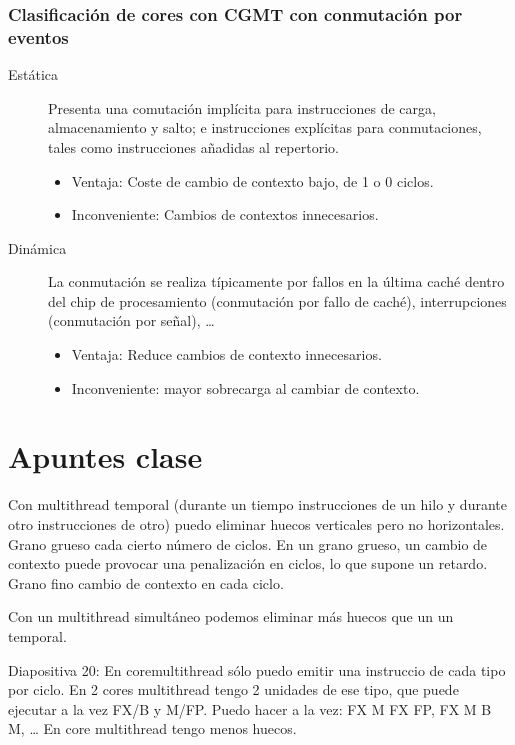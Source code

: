 \subsubsection{Clasificación de cores con CGMT con conmutación por eventos}
\begin{description}
    \item [Estática] Presenta una comutación implícita para instrucciones de carga, almacenamiento y salto; e instrucciones explícitas para conmutaciones, tales como instrucciones añadidas al repertorio.
        \begin{itemize}
            \item Ventaja: Coste de cambio de contexto bajo, de 1 o 0 ciclos.
            \item Inconveniente: Cambios de contextos innecesarios.
        \end{itemize}
    \item [Dinámica] La conmutación se realiza típicamente por fallos en la última caché dentro del chip de procesamiento (conmutación por fallo de caché), interrupciones (conmutación por señal), \ldots
        \begin{itemize}
            \item Ventaja: Reduce cambios de contexto innecesarios.
            \item Inconveniente: mayor sobrecarga al cambiar de contexto.
        \end{itemize}
\end{description}

\section{Apuntes clase}
Con multithread temporal (durante un tiempo instrucciones de un hilo y durante otro instrucciones de otro) puedo eliminar huecos verticales pero no horizontales. Grano grueso cada cierto número de ciclos. En un grano grueso, un cambio de contexto puede provocar una penalización en ciclos, lo que supone un retardo. Grano fino cambio de contexto en cada ciclo.

Con un multithread simultáneo podemos eliminar más huecos que un un temporal.

Diapositiva 20:
En coremultithread sólo puedo emitir una instruccio de cada tipo por ciclo.
En 2 cores multithread tengo 2 unidades de ese tipo, que puede ejecutar a la vez FX/B y M/FP.
Puedo hacer a la vez:
FX M FX FP, FX M B M, \ldots
En core multithread tengo menos huecos.

